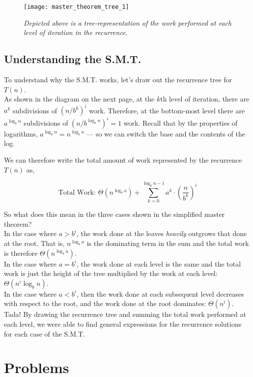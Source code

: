 \begin{figure}[ht]
    \centering
    \texttt{[image: master\_theorem\_tree\_1]}
    \caption*{\textit{Depicted above is a tree-representation of the work performed at each level of iteration in the recurrence.}}
\end{figure}

\subsection*{Understanding the S.M.T.}

To understand why the S.M.T. works, let's draw out the recurrence tree for $T(n)$. \\

As shown in the diagram on the next page, at the $k$th level of iteration, there are $a^k$ subdivisions of $(n/b^k)^i$ work. Therefore, at the bottom-most level there are $a^{\log_b n}$ subdivisions of $(n/b^{\log_b n})^i = 1$ work. Recall that by the properties of logarithms, $a^{\log_b n} = n^{\log_b a}$ --- so we can switch the base and the contents of the log.

We can therefore write the total amount of work represented by the recurrence $T(n)$ as,

$$\text{Total Work: }\Theta(n^{\log_b a}) + \sum_{k=0}^{\log_b{n-1}} a^k\cdot (\frac{n}{b^k})^i$$

So what does this mean in the three cases shown in the simplified master theorem?\\

In the case where $a > b^i$, the work done at the leaves \textit{heavily} outgrows that done at the root. That is, $n^{\log_b a}$ is the dominating term in the sum and the total work is therefore $\Theta(n^{\log_b a})$.\\

In the case where $a = b^i$, the work done at each level is the same and the total work is just the height of the tree multiplied by the work at each level: $\Theta(n^i \log_b n)$.\\

In the case where $a < b^i$, then the work done at each subsequent level decreases with respect to the root, and the work done at the root dominates: $\Theta(n^i)$.\\

Tada! By drawing the recurrence tree and summing the total work performed at each level, we were able to find general expressions for the recurrence solutions for each case of the S.M.T.
\section*{Problems}

